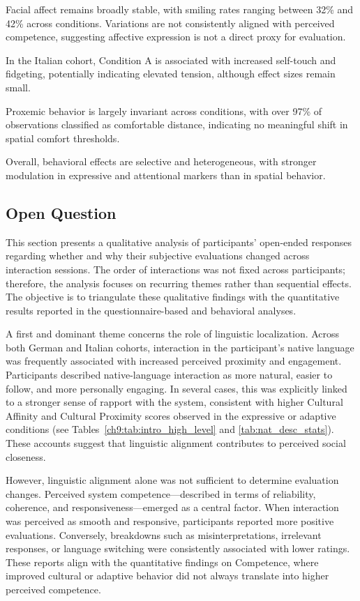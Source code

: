 Facial affect remains broadly stable, with smiling rates ranging between 32\% and 42\% across conditions. Variations are not consistently aligned with perceived competence, suggesting affective expression is not a direct proxy for evaluation.

In the Italian cohort, Condition A is associated with increased self-touch and fidgeting, potentially indicating elevated tension, although effect sizes remain small.

Proxemic behavior is largely invariant across conditions, with over 97\% of observations classified as comfortable distance, indicating no meaningful shift in spatial comfort thresholds.

Overall, behavioral effects are selective and heterogeneous, with stronger modulation in expressive and attentional markers than in spatial behavior.

\subsection{Open Question}

This section presents a qualitative analysis of participants’ open-ended responses regarding whether and why their subjective evaluations changed across interaction sessions. The order of interactions was not fixed across participants; therefore, the analysis focuses on recurring themes rather than sequential effects. The objective is to triangulate these qualitative findings with the quantitative results reported in the questionnaire-based and behavioral analyses.

A first and dominant theme concerns the role of linguistic localization. Across both German and Italian cohorts, interaction in the participant’s native language was frequently associated with increased perceived proximity and engagement. Participants described native-language interaction as more natural, easier to follow, and more personally engaging. In several cases, this was explicitly linked to a stronger sense of rapport with the system, consistent with higher Cultural Affinity and Cultural Proximity scores observed in the expressive or adaptive conditions (see Tables~\ref{ch9:tab:intro_high_level} and \ref{tab:nat_desc_stats}). These accounts suggest that linguistic alignment contributes to perceived social closeness.

However, linguistic alignment alone was not sufficient to determine evaluation changes. Perceived system competence—described in terms of reliability, coherence, and responsiveness—emerged as a central factor. When interaction was perceived as smooth and responsive, participants reported more positive evaluations. Conversely, breakdowns such as misinterpretations, irrelevant responses, or language switching were consistently associated with lower ratings. These reports align with the quantitative findings on Competence, where improved cultural or adaptive behavior did not always translate into higher perceived competence.

